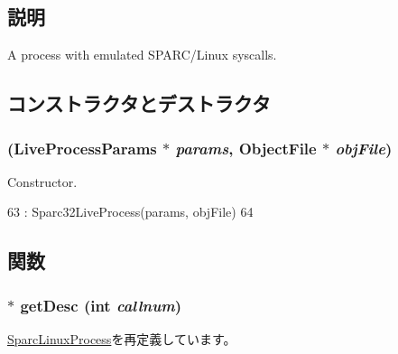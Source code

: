 \subsection{説明}
A process with emulated SPARC/Linux syscalls. 

\subsection{コンストラクタとデストラクタ}
\hypertarget{classSparcISA_1_1Sparc32LinuxProcess_aab2d40cec112dec0eefda2a68893bf03}{
\subsubsection[{Sparc32LinuxProcess}]{ (LiveProcessParams $\ast$ {\em params}, \/  {\bf ObjectFile} $\ast$ {\em objFile})}}
\label{classSparcISA_1_1Sparc32LinuxProcess_aab2d40cec112dec0eefda2a68893bf03}


Constructor. 


\begin{DoxyCode}
63     : Sparc32LiveProcess(params, objFile)
64 {}
\end{DoxyCode}


\subsection{関数}
\hypertarget{classSparcISA_1_1Sparc32LinuxProcess_a85e8ccf0c435d95c14574f0a217f5116}{
\subsubsection[{getDesc}]{$\ast$ getDesc (int {\em callnum})}}
\label{classSparcISA_1_1Sparc32LinuxProcess_a85e8ccf0c435d95c14574f0a217f5116}


\hyperlink{classSparcISA_1_1SparcLinuxProcess_aebbff609a7235342925445690acf5ee8}{SparcLinuxProcess}を再定義しています。


